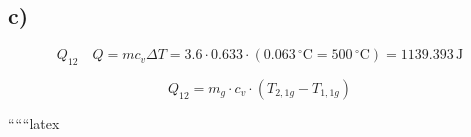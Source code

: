 

\subsection*{c)}

\[
Q_{12} \quad Q = m c_v \Delta T = 3.6 \cdot 0.633 \cdot (0.063 \, ^\circ \text{C} = 500 \, ^\circ \text{C}) = 1139.393 \, \text{J}
\]

\[
Q_{12} = m_{g} \cdot c_v \cdot (T_{2,1g} - T_{1,1g})
\]

``````latex